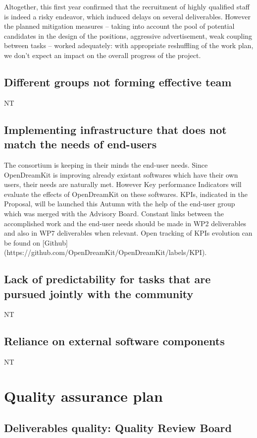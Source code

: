 \documentclass{deliverablereport}
\begin{document}
Altogether, this first year confirmed that the recruitment of highly
qualified staff is indeed a risky endeavor, which induced delays on
several deliverables. However the planned mitigation measures --
taking into account the pool of potential candidates in the design of
the positions, aggressive advertisement, weak coupling between tasks
-- worked adequately: with appropriate reshuffling of the work plan,
we don't expect an impact on the overall progress of the project.

\subsection{Different groups not forming effective team}
NT
\subsection{Implementing infrastructure that does not match the needs of end-users}

The consortium is keeping in their minds the end-user needs. Since OpenDreamKit is improving already existant softwares which have their own users, their needs are naturally met. However Key performance Indicators will evaluate the effects of OpenDreamKit on these softwares. KPIs, indicated in the Proposal, will be launched this Autumn with the help of the end-user group which was merged with the Advisory Board. Constant links between the accomplished work and the end-user needs should be made in WP2 deliverables and also in WP7 deliverables when relevant.
Open tracking of KPIs evolution can be found on [Github](https://github.com/OpenDreamKit/OpenDreamKit/labels/KPI).

\subsection{Lack of predictability for tasks that are pursued jointly with the community}
NT
\subsection{Reliance on external software components}
NT

\section{Quality assurance plan}

\subsection{Deliverables quality: Quality Review Board}
 ~\\~\\
\end{document}
